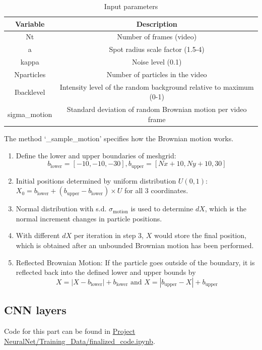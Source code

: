 \documentclass[11pt,a4paper]{scrartcl}
\begin{document}
\begin{table}[h]
\centering
\begin{tabular}{cc}
\toprule
\textbf{Variable} & \textbf{Description}  \\
\midrule
Nt & Number of frames (video) \\
a & Spot radius scale factor (1.5-4) \\
kappa & Noise level (0.1) \\
Nparticles & Number of particles in the video \\
Ibacklevel & Intensity level of the random background relative to maximum (0-1) \\
sigma\_motion & Standard deviation of random Brownian motion per video frame \\
\bottomrule
\end{tabular}
\caption{Input parameters}
\end{table}
\newpage

The method `\_sample\_motion' specifies how the Brownian motion works. 

\begin{enumerate}
    \item Define the lower and upper boundaries of meshgrid: 
    $$b_{\text{lower}} = [-10, -10, -30], b_{\text{upper}} = [Nx + 10, Ny + 10, 30]$$
    \item Initial positions determined by uniform distribution $U(0,1)$: $X_0 = b_{\text{lower}} + (b_{\text{upper}} - b_{\text{lower}}) \times U$ for all 3 coordinates.
    \item Normal distribution with s.d. $\sigma_{\text{motion}}$ is used to determine $dX$, which is the normal increment changes in particle positions.
    \item With different $dX$ per iteration in step 3, $X$ would store the final position, which is obtained after an unbounded Brownian motion has been performed.
    \item Reflected Brownian Motion: If the particle goes outside of the boundary, it is reflected back into the defined lower and upper bounds by
    $$X = |X - b_{\text{lower}}| + b_{\text{lower}} \text{ and } X = |b_{\text{upper}} - X| + b_{\text{upper}}$$
\end{enumerate}

\subsection{CNN layers}

Code for this part can be found in \url{Project NeuralNet/Training_Data/finalized_code.ipynb}.\\
\end{document}

